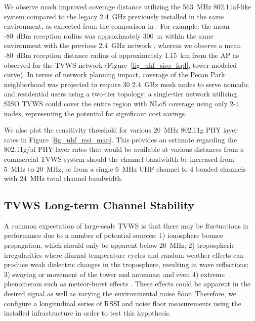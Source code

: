 	We observe much improved coverage distance utilizing the 563~MHz 802.11af-like system compared to the legacy 2.4~GHz previously installed in the same environment, as expected from the comparison in \cite{flores2013ieee80211af}.
	For example: the mean -80~dBm reception radius was approximately 300~m within the same environment with the previous 2.4~GHz network \cite{camp2006measurement}, whereas we observe a mean -80~dBm reception distance radius of approximately 1.15~km from the \ac{AP} as observed for the \ac{TVWS} network (Figure~\ref{fig_uhf_siso_fspl}, tower modeled curve).
	In terms of network planning impact, coverage of the Pecan Park neighborhood was projected to require 30 2.4~GHz mesh nodes to serve nomadic and residential users \cite{camp2006developing, camp2008measurement} using a two-tier topology; a single-tier network utilizing \ac{SISO} \ac{TVWS} could cover the entire region with \ac{NLoS} coverage using only 2-4 nodes, representing the potential for significant cost savings.
	
	We also plot the sensitivity threshold for various 20~MHz 802.11g \ac{PHY} layer rates in Figure~\ref{fig_uhf_rssi_map}.
	This provides an estimate regarding the 802.11g/af \ac{PHY} layer rates that would be available at various distances from a commercial \ac{TVWS} system should the channel bandwidth be increased from 5~MHz to 20~MHz, or from a single 6~MHz UHF channel to 4 bonded channels with 24~MHz total channel bandwidth.

\subsection{TVWS Long-term Channel Stability}
\label{sec_tfa_stability}

	A common expectation of large-scale \ac{TVWS} is that there may be fluctuations in performance due to a number of potential sources: 1) ionosphere bounce propagation, which should only be apparent below 20~MHz; 2) tropospheric irregularities where diurnal temperature cycles and random weather effects can produce weak dielectric changes in the troposphere, resulting in wave reflections; 3) swaying or movement of the tower and antennas; and even 4) extreme phenomenon such as meteor-burst effects \cite{raab2002hf}.
	These effects could be apparent in the desired signal as well as varying the environmental noise floor.
	Therefore, we configure a longitudinal series of \ac{RSSI} and noise floor measurements using the installed infrastructure in order to test this hypothesis.

